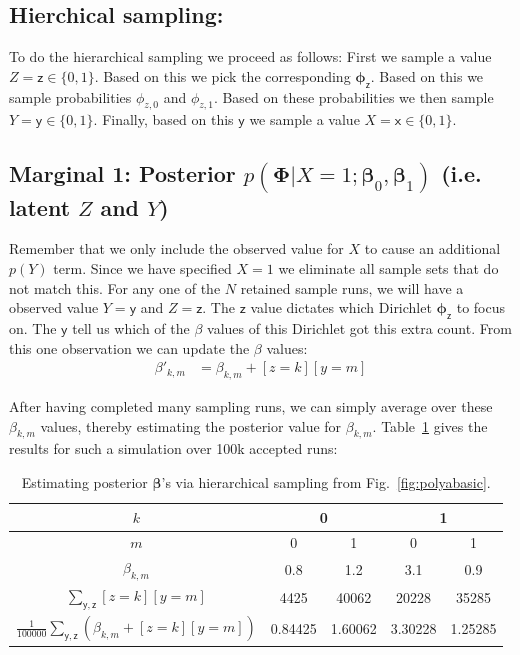 \documentclass[oneside,english]{scrbook}
\begin{document}
\subsection{Hierchical sampling:}
To do the hierarchical sampling we proceed as follows: First we sample
a value $Z=\mathsf{z} \in \{0,1\}$. Based on this we pick the
corresponding $\bm{\phi}_{\mathsf{z}}$. Based on this we sample
probabilities $\phi_{\mathsf{}z,0}$ and $\phi_{\mathsf{}z,1}$. Based
on these probabilities we then sample $Y=\mathsf{y} \in
\{0,1\}$. Finally, based on this $\mathsf{y}$ we sample a value
$X=\mathsf{x} \in \{0,1\}$.

\subsection{Marginal 1: Posterior $p(\bm{\Phi}|X=1;\bm{\beta}_0,\bm{\beta}_1)$ (i.e. latent $Z$ and $Y$)}
Remember that we only include the observed value for $X$ to cause an
additional $p(Y)$ term. Since we have specified $X=1$ we eliminate all
sample sets that do not match this. For any one of the $N$ retained
sample runs, we will have a observed value $Y=\mathsf{y}$ and
$Z=\mathsf{z}$. The $\mathsf{z}$ value dictates which Dirichlet
$\bm{\phi}_{\mathsf{z}}$ to focus on. The $\mathsf{y}$ tell us which
of the $\beta$ values of this Dirichlet got this extra count. From
this one observation we can update the $\beta$ values:
\begin{align*}
  \beta'_{k,m} &= \beta_{k,m}+[z=k][y=m]
\end{align*}

After having completed many sampling runs, we can simply average over
these $\beta_{k,m}$ values, thereby estimating the posterior value for
$\beta_{k,m}$. Table~\ref{tab:samplecondpolya1} gives the results for such
a simulation over 100k accepted runs:
\begin{table}[!h]
\begin{center}
  \begin{tabular}{c | cc|cc}
    $k$ & \multicolumn{2}{c|}{0} & \multicolumn{2}{c}{1} \\ \hline
    $m$ & 0 & 1 & 0 & 1\\ \hline
    $\beta_{k,m}$ & 0.8 & 1.2 & 3.1 & 0.9\\
    $\sum_{\mathsf{y,z}}[z=k][y=m]$ & 4425 & 40062 & 20228 & 35285 \\
    $\frac{1}{100000}\sum_{\mathsf{y,z}} (\beta_{k,m} + [z=k][y=m])$ & 0.84425 & 1.60062 & 3.30228 & 1.25285\\
  \end{tabular}
\end{center}
\caption{Estimating posterior $\bm{\beta}$'s via hierarchical sampling from Fig.~\ref{fig:polyabasic}.  \label{tab:samplecondpolya1} }
\end{table}
\end{document}
